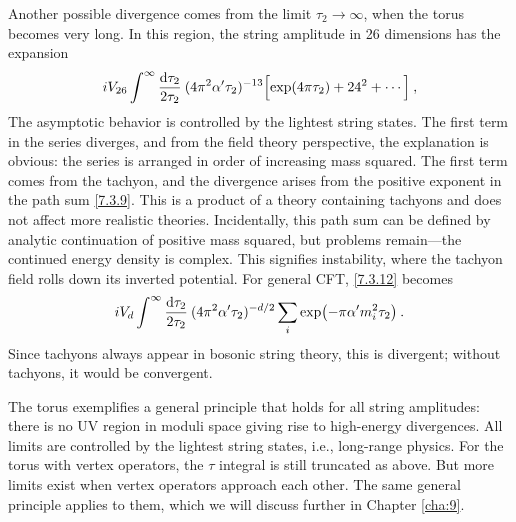 Another possible divergence comes from the limit $\tau_{2} \rightarrow \infty$, when the torus becomes very long. 
In this region, the string amplitude in 26 dimensions has the expansion 
\begin{equation}
	i V_{26} \int^{\infty} \frac{\mathrm{d} \tau_{2}}{2 \tau_{2}} \:(4 \pi^{2} \alpha^{\prime} \tau_{2})^{-13}
	\Bigl[\exp (4 \pi \tau_{2})+24^{2}+\cdots\Bigr] \:, \label{7.3.15} 
\end{equation}
The asymptotic behavior is controlled by the lightest string states. The first term in the series diverges, and from the field theory perspective, the explanation is obvious: the series is arranged in order of increasing mass squared. 
The first term comes from the tachyon, and the divergence arises from the positive exponent in the path sum \eqref{7.3.9}. This is a product of a theory containing tachyons and does not affect more realistic theories. Incidentally, this path sum can be defined by analytic continuation of positive mass squared, but problems remain—the continued energy density is complex. This signifies instability, where the tachyon field rolls down its inverted potential. For general CFT, \eqref{7.3.12} becomes 
\begin{equation}
	i V_{d} \int^{\infty} \frac{\mathrm{d} \tau_{2}}{2 \tau_{2}} \: (4 \pi^{2} \alpha^{\prime} \tau_{2})^{-d / 2} 
	\sum_{i} \exp (-\pi \alpha^{\prime} m_{i}^{2} \tau_{2}) \:. \label{7.3.16} 
\end{equation}
Since tachyons always appear in bosonic string theory, this is divergent; without tachyons, it would be convergent. 

The torus exemplifies a general principle that holds for all string amplitudes: there is no UV region in moduli space giving rise to high-energy divergences. All limits are controlled by the lightest string states, i.e., long-range physics. For the torus with vertex operators, the $\tau$ integral is still truncated as above. But more limits exist when vertex operators approach each other. The same general principle applies to them, which we will discuss further in Chapter \ref{cha:9}. 

